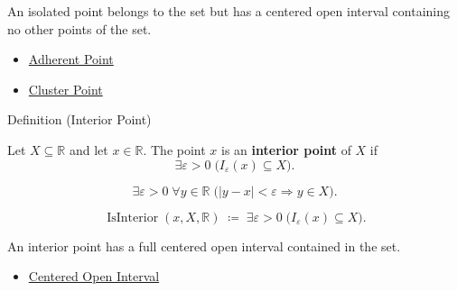 \begin{remark*}[Interpretation]
An isolated point belongs to the set but has a centered open interval containing
no other points of the set.
\end{remark*}

\begin{dependencies}
\begin{itemize}
  \item \hyperref[def:adherent-point-r]{Adherent Point}
  \item \hyperref[def:cluster-point-r]{Cluster Point}
\end{itemize}
\end{dependencies}


\begin{definitionbox}{Definition (Interior Point)}
\begin{definition}
\label{def:interior-point-r}
Let $X\subseteq\mathbb{R}$ and let $x\in\mathbb{R}$. The point $x$ is
an \textbf{interior point} of $X$ if
\[
  \exists\varepsilon>0\;\bigl(I_\varepsilon(x)\subseteq X\bigr).
\]
\end{definition}
\end{definitionbox}

\begin{remark*}
\[
  \exists\varepsilon>0\;\forall y\in\mathbb{R}\;\bigl(|y-x|<\varepsilon\Rightarrow y\in X\bigr).
\]
\end{remark*}

\begin{remark*}
\[
  \operatorname{IsInterior}(x,X,\mathbb{R})\;\coloneqq\;\exists\varepsilon>0\;\bigl(I_\varepsilon(x)\subseteq X\bigr).
\]
\end{remark*}

\begin{remark*}[Interpretation]
An interior point has a full centered open interval contained in the set.
\end{remark*}

\begin{dependencies}
\begin{itemize}
  \item \hyperref[def:epsilon-neighbourhood]{Centered Open Interval}
\end{itemize}
\end{dependencies}

